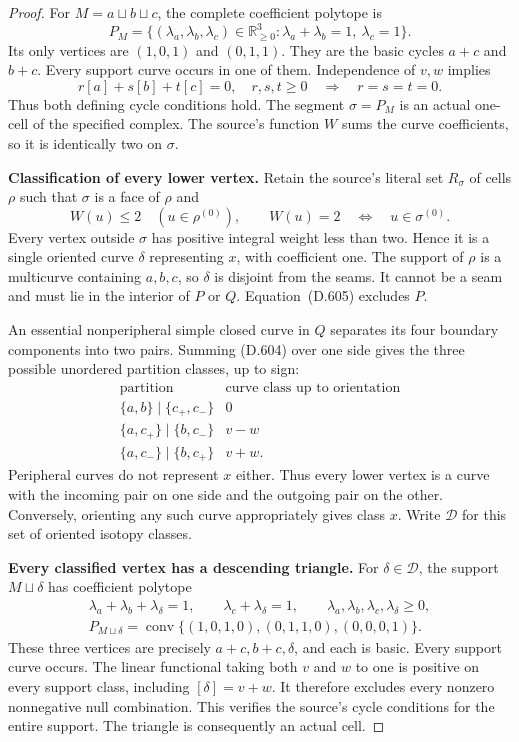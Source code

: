 \begin{proof}
For $M=a\sqcup b\sqcup c$, the complete coefficient
polytope is
\[
 P_M=\{(\lambda_a,\lambda_b,\lambda_c)\in
       \mathbb R_{\ge0}^3:
       \lambda_a+\lambda_b=1,\ \lambda_c=1\}.
 \tag{D.606}
\]
Its only vertices are $(1,0,1)$ and $(0,1,1)$.
They are the basic cycles $a+c$ and $b+c$.
Every support curve occurs in one of them.
Independence of $v,w$ implies
\[
 r[a]+s[b]+t[c]=0,\quad r,s,t\ge0
       \quad\Longrightarrow\quad r=s=t=0.
 \tag{D.607}
\]
Thus both defining cycle conditions hold.
The segment $\sigma=P_M$ is an actual one-cell of the
specified complex.  The source's function $W$ sums
the curve coefficients, so it is identically two on
$\sigma$.

\medskip\noindent\textbf{Classification of every lower vertex.}
Retain the source's literal set $R_\sigma$ of cells
$\rho$ such that $\sigma$ is a face of $\rho$ and
\[
 W(u)\le2\quad(u\in\rho^{(0)}),\qquad
 W(u)=2\quad\Longleftrightarrow\quad u\in\sigma^{(0)}.
 \tag{D.608}
\]
Every vertex outside $\sigma$ has positive integral
weight less than two.  Hence it is a single oriented
curve $\delta$ representing $x$, with coefficient one.
The support of $\rho$ is a multicurve containing
$a,b,c$, so $\delta$ is disjoint from the seams.
It cannot be a seam and must lie in the interior of
$P$ or $Q$.  Equation~(D.605) excludes $P$.

An essential nonperipheral simple closed curve in $Q$
separates its four boundary components into two pairs.
Summing (D.604) over one side gives the three possible
unordered partition classes, up to sign:
\[
 \begin{array}{c|c}
 \text{partition}&\text{curve class up to orientation}\\ \hline
 \{a,b\}\mid\{c_+,c_-\}&0\\
 \{a,c_+\}\mid\{b,c_-\}&v-w\\
 \{a,c_-\}\mid\{b,c_+\}&v+w .
 \end{array}
 \tag{D.609}
\]
Peripheral curves do not represent $x$ either.
Thus every lower vertex is a curve with the incoming
pair on one side and the outgoing pair on the other.
Conversely, orienting any such curve appropriately
gives class $x$.  Write $\mathscr D$ for this set of
oriented isotopy classes.

\medskip\noindent\textbf{Every classified vertex has a descending triangle.}
For $\delta\in\mathscr D$, the support $M\sqcup\delta$
has coefficient polytope
\[
 \begin{gathered}
 \lambda_a+\lambda_b+\lambda_\delta=1,\qquad
 \lambda_c+\lambda_\delta=1,\qquad
 \lambda_a,\lambda_b,\lambda_c,\lambda_\delta\ge0,\\
 P_{M\sqcup\delta}
    =\operatorname{conv}\{(1,0,1,0),(0,1,1,0),(0,0,0,1)\}.
 \end{gathered}
 \tag{D.610}
\]
These three vertices are precisely $a+c,b+c,\delta$,
and each is basic.  Every support curve occurs.
The linear functional taking both $v$ and $w$ to one
is positive on every support class, including
$[\delta]=v+w$.  It therefore excludes every
nonzero nonnegative null combination.  This verifies
the source's cycle conditions for the entire support.
The triangle is consequently an actual cell.


\end{proof}
